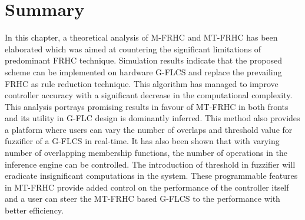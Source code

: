 \section{Summary}
In this chapter, a theoretical analysis of M-FRHC and MT-FRHC has been elaborated which was aimed at countering the significant limitations of predominant FRHC technique. Simulation results indicate that the proposed scheme can be implemented on hardware G\hyp{}FLCS and replace the prevailing FRHC as rule reduction technique. This algorithm has managed to improve controller accuracy with a significant decrease in the computational complexity. This analysis portrays promising results in favour of MT-FRHC in both fronts and its utility in G-FLC design is dominantly inferred. This method also provides a platform where users can vary the number of overlaps and threshold value for fuzzifier of a G-FLCS in real-time. It has also been shown that with varying number of overlapping membership functions, the number of operations in the inference engine can be controlled. The introduction of threshold in fuzzifier will eradicate insignificant computations in the system. These programmable features in MT-FRHC provide added control on the performance of the controller itself and a user can steer the MT-FRHC based G-FLCS to the performance with better efficiency.